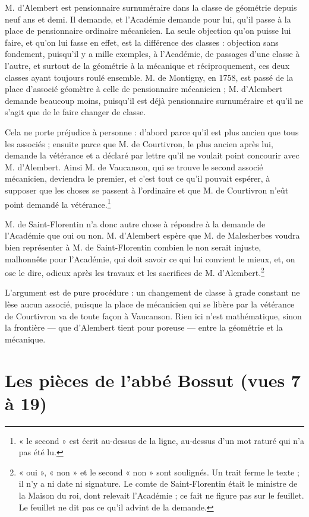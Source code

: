 \documentclass[11pt,a4paper]{article}
\begin{document}
M. d'Alembert est pensionnaire surnuméraire dans la classe de géométrie depuis
neuf ans et demi. Il demande, et l'Académie demande pour lui, qu'il passe à la
place de pensionnaire ordinaire mécanicien. La seule objection qu'on puisse
lui faire, et qu'on lui fasse en effet, est la différence des classes :
objection sans fondement, puisqu'il y a mille exemples, à l'Académie, de
passages d'une classe à l'autre, et surtout de la géométrie à la mécanique et
réciproquement, ces deux classes ayant toujours roulé ensemble. M. de Montigny,
en 1758, est passé de la place d'associé géomètre à celle de pensionnaire
mécanicien ; M. d'Alembert demande beaucoup moins, puisqu'il est déjà
pensionnaire surnuméraire et qu'il ne s'agit que de le faire changer de
classe.

Cela ne porte préjudice à personne : d'abord parce qu'il est plus ancien que
tous les associés ; ensuite parce que M. de Courtivron, le plus ancien après
lui, demande la vétérance et a déclaré par lettre qu'il ne voulait point
concourir avec M. d'Alembert. Ainsi M. de Vaucanson, qui se trouve le second
associé mécanicien, deviendra le premier, et c'est tout ce qu'il pouvait
espérer, à supposer que les choses se passent à l'ordinaire et que M. de
Courtivron n'eût point demandé la vétérance.\footnote{« le second » est écrit
au-dessus de la ligne, au-dessus d'un mot raturé qui n'a pas été lu.}

M. de Saint-Florentin n'a donc autre chose à répondre à la demande de
l'Académie que oui ou non. M. d'Alembert espère que M. de Malesherbes voudra
bien représenter à M. de Saint-Florentin combien le non serait injuste,
malhonnête pour l'Académie, qui doit savoir ce qui lui convient le mieux, et,
on ose le dire, odieux après les travaux et les sacrifices de M.
d'Alembert.\footnote{« oui », « non » et le second « non » sont soulignés. Un
trait ferme le texte ; il n'y a ni date ni signature. Le comte de
Saint-Florentin était le ministre de la Maison du roi, dont relevait
l'Académie ; ce fait ne figure pas sur le feuillet. Le feuillet ne dit pas ce
qu'il advint de la demande.}

L'argument est de pure procédure : un changement de classe à grade constant
ne lèse aucun associé, puisque la place de mécanicien qui se libère par la
vétérance de Courtivron va de toute façon à Vaucanson. Rien ici n'est
mathématique, sinon la frontière — que d'Alembert tient pour poreuse — entre
la géométrie et la mécanique.

\section*{Les pièces de l'abbé Bossut (vues 7 à 19)}
\end{document}
